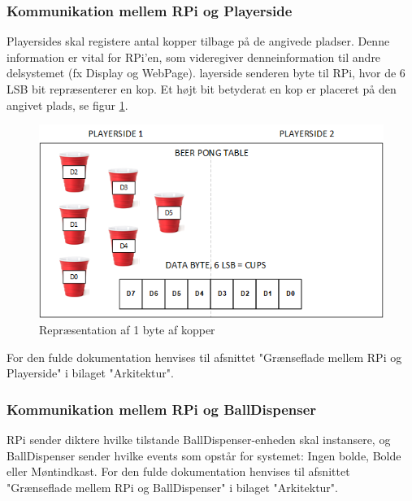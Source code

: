 \documentclass[Rapport/Rapport_main.tex]{subfiles}
\begin{document}
\subsubsection{Kommunikation mellem RPi og Playerside}
Playersides skal registere antal kopper tilbage på de angivede pladser. Denne information er vital for RPi’en, som videregiver denneinformation til andre delsystemet (fx Display og WebPage). layerside senderen byte til RPi, hvor de 6 LSB bit repræsenterer en kop. Et højt bit betyderat en kop er placeret på den angivet plads, se figur \ref{fig:cups_setup}.
\begin{figure}[H]
    \centering
    \includegraphics[width=\textwidth]{Arkitektur/Grenseflader/Graphics/cups.png}
    \caption{Repræsentation af 1 byte af kopper}
    \label{fig:cups_setup}
\end{figure}
For den fulde dokumentation henvises til afsnittet "Grænseflade mellem RPi og Playerside" i bilaget "Arkitektur". 
\subsubsection{Kommunikation mellem RPi og BallDispenser}
RPi sender diktere hvilke tilstande BallDispenser-enheden skal instansere, og BallDispenser sender hvilke events som opstår for systemet: Ingen bolde, Bolde eller Møntindkast. For den fulde dokumentation henvises til afsnittet "Grænseflade mellem RPi og BallDispenser" i bilaget "Arkitektur". 
\end{document}
